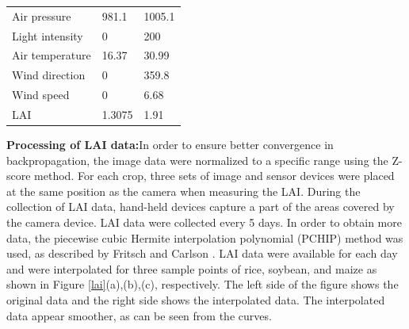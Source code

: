 \documentclass[acmsmall, screen]{acmart}
\begin{document}
\begin{table}
\begin{tabular}{lll}
    Air pressure                              & 981.1                       & 1005.1                      \\
    Light intensity                           & 0                           & 200                         \\
    Air temperature                           & 16.37                       & 30.99                       \\
    Wind direction                            & 0                           & 359.8                       \\
    Wind speed                                & 0                           & 6.68                        \\
    LAI                                       & 1.3075                      & 1.91                        \\
    \hline
  \end{tabular}%
\end{table}


\textbf{Processing of LAI data:}In order to ensure better convergence in backpropagation, the image data were normalized to a specific range using the Z-score method. For each crop, three sets of image and sensor devices were placed at the same position as the camera when measuring the LAI.  During the collection of LAI data, hand-held devices capture a part of the areas covered by the camera device. LAI data were collected every 5 days. In order to obtain more data, the piecewise cubic Hermite interpolation polynomial (PCHIP) method was used, as described by Fritsch and Carlson \cite{fritsch1980monotone}. LAI data were available for each day and were interpolated for three sample points of rice, soybean, and maize as shown in Figure \ref{lai}(a),(b),(c), respectively. The left side of the figure shows the original data and the right side shows the interpolated data. The interpolated data appear smoother, as can be seen from the curves.
\end{document}
